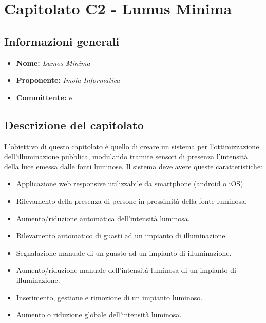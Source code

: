 \section{Capitolato C2 - Lumus Minima}\label{section:c2}

\subsection{Informazioni generali}
\begin{itemize}
    \item \textbf{Nome:} \textit{Lumos Minima}
    \item \textbf{Proponente:} \textit{Imola Informatica}
    \item \textbf{Committente:} \commitNameM{} e \commitNameS{}
\end{itemize}

\subsection{Descrizione del capitolato}
L’obiettivo di questo capitolato è quello di creare un sistema per l’ottimizzazione dell’illuminazione pubblica, modulando tramite sensori di presenza l’intensità della luce emessa dalle fonti luminose.\newline
Il sistema deve avere queste caratteristiche:
\begin{itemize}
    \item Applicazione web responsive utilizzabile da smartphone (android o iOS).
    \item Rilevamento della presenza di persone in prossimità della fonte luminosa.
    \item Aumento/riduzione automatica dell’intensità luminosa.
    \item Rilevamento automatico di guasti ad un impianto di illuminazione.
    \item Segnalazione manuale di un guasto ad un impianto di illuminazione.
    \item Aumento/riduzione manuale dell’intensità luminosa di un impianto di illuminazione.
    \item Inserimento, gestione e rimozione di un impianto luminoso.
    \item Aumento o riduzione globale dell’intensità luminosa.
\end{itemize}

